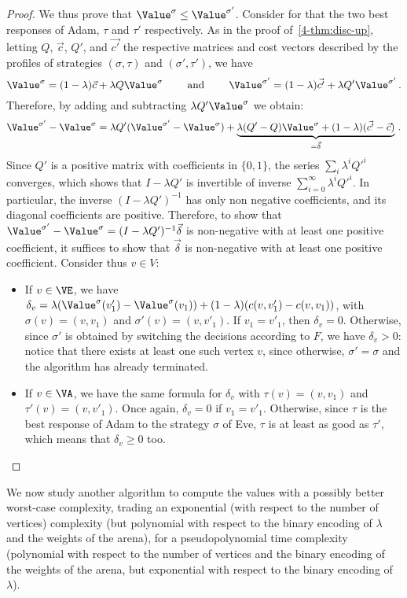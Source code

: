 \begin{proof}
  We thus prove that $\Value^\sigma\leq \Value^{\sigma'}$. Consider
  for that the two best responses of Adam, $\tau$ and $\tau'$
  respectively. As in the proof of~\cref{4-thm:disc-up}, letting $Q$,
  $\vec c$, $Q'$, and $\vec {c'}$ the respective matrices and cost
  vectors described by the profiles of strategies $(\sigma,\tau)$ and
  $(\sigma',\tau')$, we have
  \[\Value^\sigma = (1-\lambda) \vec c + \lambda Q \Value^\sigma \qquad
    \text{ and } \qquad \Value^{\sigma'} = (1-\lambda) \vec {c'} +
    \lambda Q' \Value^{\sigma'}\,.\]
  Therefore, by adding and subtracting $\lambda Q'
  \Value^\sigma$ we obtain:
  \[\Value^{\sigma'}-\Value^\sigma=\lambda Q'
    (\Value^{\sigma'}-\Value^{\sigma}) + \underbrace{\lambda
      (Q'-Q)\Value^\sigma + (1-\lambda)(\vec{c'}-\vec c)}_{=\vec
      \delta}\,.\] Since $Q'$ is a positive matrix with coefficients in
  $\{0,1\}$, the series $\sum_i \lambda^iQ'^i$ converges, which shows
  that $I-\lambda Q'$ is invertible of inverse
  $\sum_{i=0}^\infty \lambda^i Q'^i$. In particular, the inverse
  $(I-\lambda Q')^{-1}$ has only non negative coefficients, and its
  diagonal coefficients are positive. Therefore, to show that
  $\Value^{\sigma'}-\Value^\sigma=(I-\lambda Q')^{-1} \vec\delta$ is
  non-negative with at least one positive coefficient, it suffices to
  show that $\vec\delta$ is non-negative with at least one positive
  coefficient. Consider thus $v\in V$:
  \begin{itemize}
  \item If $v\in \VE$, we have
    $\delta_v=\lambda(\Value^{\sigma}(v'_1)-\Value^\sigma(v_1)) +
    (1-\lambda)(c(v,v'_1)-c(v,v_1))$, with
    $\sigma(v)=(v,v_1)$ and $\sigma'(v)=(v,v'_1)$. If $v_1=v'_1$, then
    $\delta_v=0$. Otherwise, since $\sigma'$ is obtained by switching
    the decisions according to $F$, we have $\delta_v>0$: notice that
    there exists at least one such vertex $v$, since otherwise,
    $\sigma'=\sigma$ and the algorithm has already terminated.
  \item If $v\in \VA$, we have the same formula for $\delta_v$ with
    $\tau(v)=(v,v_1)$ and $\tau'(v)=(v,v'_1)$. Once again, $\delta_v=0$
    if $v_1=v'_1$. Otherwise, since $\tau$ is the best response of Adam
    to the strategy $\sigma$ of Eve, $\tau$ is at least as good as
    $\tau'$, which means that $\delta_v\geq 0$ too.
  \end{itemize}
\end{proof}

We now study another algorithm to compute the values with a possibly
better worst-case complexity, trading an exponential (with respect to
the number of vertices) complexity (but polynomial with respect to the
binary encoding of $\lambda$ and the weights of the arena), for a
pseudopolynomial time complexity (polynomial with respect to the
number of vertices and the binary encoding of the weights of the
arena, but exponential with respect to the binary encoding of
$\lambda$).

